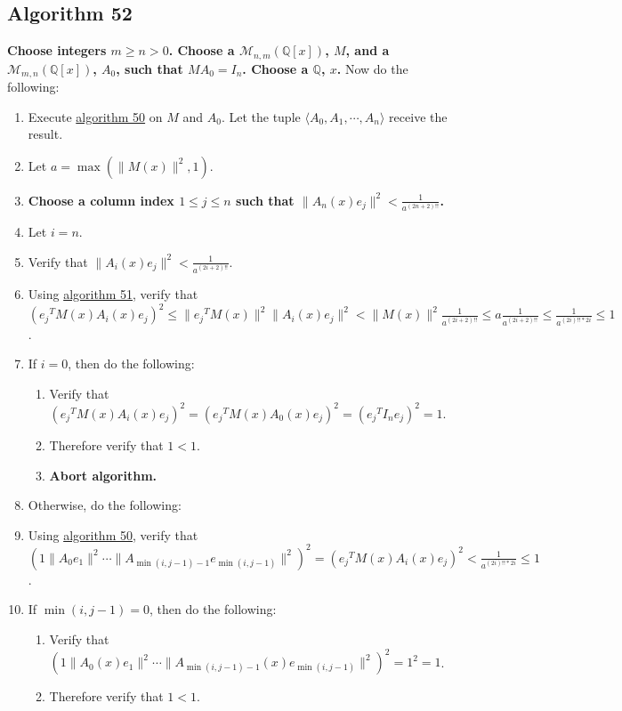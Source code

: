 \documentclass[twocolumn]{article}
\begin{document}
		\subsection{Algorithm 52}\label{sec:algorithm 52}
			\textbf{Choose integers $m\ge n>0$. Choose a $\mathcal{M}_{n,m}(\mathbb{Q}[x])$, $M$, and a $\mathcal{M}_{m,n}(\mathbb{Q}[x])$, $A_0$, such that $MA_0=I_n$. Choose a $\mathbb{Q}$, $x$.} Now do the following:
			\begin{enumerate}
				\item Execute \hyperref[sec:algorithm 50]{algorithm 50} on $M$ and $A_0$. Let the tuple $\langle A_0,A_1,\cdots,A_n\rangle$ receive the result.
				\item Let $a=\max(\lVert M(x)\rVert^2,1)$.
				\item \textbf{Choose a column index $1\le j\le n$ such that $\lVert A_n(x)e_j\rVert^2<\frac{1}{a^{(2n+2)!!}}$.}
				\item Let $i=n$.
				\item Verify that $\lVert A_i(x)e_j\rVert^2<\frac{1}{a^{(2i+2)!!}}$.
				\item Using \hyperref[sec:algorithm 51]{algorithm 51}, verify that $({e_j}^TM(x)A_i(x)e_j)^2\le\lVert{e_j}^TM(x)\rVert^2\lVert A_i(x)e_j\rVert^2<\lVert M(x)\rVert^2\frac{1}{a^{(2i+2)!!}}\le a\frac{1}{a^{(2i+2)!!}}\le\frac{1}{a^{(2i)!!*2i}}\le 1$.
				\item If $i=0$, then do the following:
				\begin{enumerate}
					\item Verify that $({e_j}^TM(x)A_i(x)e_j)^2=({e_j}^TM(x)A_0(x)e_j)^2=({e_j}^TI_ne_j)^2=1$.
					\item Therefore verify that $1<1$.
					\item \textbf{Abort algorithm.}
				\end{enumerate}
				\item Otherwise, do the following:
				\item Using \hyperref[sec:algorithm 50]{algorithm 50}, verify that $(1\lVert A_0e_1\rVert^2\cdots\lVert A_{\min(i,j-1)-1}e_{\min(i,j-1)}\rVert^2)^2=({e_j}^TM(x)A_i(x)e_j)^2<\frac{1}{a^{(2i)!!*2i}}\le 1$.
				\item If $\min(i,j-1)=0$, then do the following:
				\begin{enumerate}
					\item Verify that $(1\lVert A_0(x)e_1\rVert^2\cdots\allowbreak\lVert A_{\min(i,j-1)-1}(x)e_{\min(i,j-1)}\rVert^2)^2=1^2=1$.
					\item Therefore verify that $1<1$.

\end{enumerate}
\end{enumerate}
\end{document}
